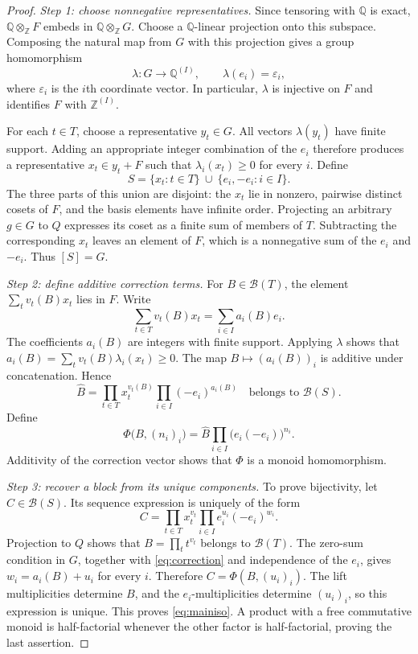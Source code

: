 \documentclass[11pt,reqno]{amsart}
\numberwithin{equation}{section}
\theoremstyle{definition}
\theoremstyle{remark}
\newcommand{\Z}{\mathbb Z}
\newcommand{\Q}{\mathbb Q}
\newcommand{\B}{\mathcal B}
\begin{document}
\begin{proof}
\emph{Step 1: choose nonnegative representatives.}
Since tensoring with $\Q$ is exact,
$\Q\otimes_{\Z}F$ embeds in $\Q\otimes_{\Z}G$. Choose a
$\Q$-linear projection onto this subspace. Composing the natural
map from $G$ with this projection gives a group homomorphism
\[
 \lambda:G\longrightarrow\Q^{(I)},\qquad
 \lambda(e_i)=\varepsilon_i,
\]
where $\varepsilon_i$ is the $i$th coordinate vector. In particular,
$\lambda$ is injective on $F$ and identifies $F$ with
$\Z^{(I)}$.

For each $t\in T$, choose a representative $y_t\in G$. All vectors
$\lambda(y_t)$ have finite support. Adding an appropriate integer
combination of the $e_i$ therefore produces a representative
$x_t\in y_t+F$ such that $\lambda_i(x_t)\ge0$ for every $i$.
Define
\begin{equation}\label{eq:S}
 S=\{x_t:t\in T\}\ \cup\ \{e_i,-e_i:i\in I\}.
\end{equation}
The three parts of this union are disjoint: the $x_t$ lie in
nonzero, pairwise distinct cosets of $F$, and the basis elements
have infinite order. Projecting an arbitrary $g\in G$ to $Q$
expresses its coset as a finite sum of members of $T$. Subtracting
the corresponding $x_t$ leaves an element of $F$, which is a
nonnegative sum of the $e_i$ and $-e_i$. Thus $[S]=G$.

\emph{Step 2: define additive correction terms.}
For $B\in\B(T)$, the element $\sum_t v_t(B)x_t$ lies in $F$.
Write
\begin{equation}\label{eq:correction}
 \sum_{t\in T}v_t(B)x_t=\sum_{i\in I}a_i(B)e_i.
\end{equation}
The coefficients $a_i(B)$ are integers with finite support.
Applying $\lambda$ shows that
$a_i(B)=\sum_t v_t(B)\lambda_i(x_t)\ge0$. The map
$B\mapsto(a_i(B))_i$ is additive under concatenation. Hence
\begin{equation}\label{eq:hat}
 \widehat B=
 \prod_{t\in T}x_t^{v_t(B)}
 \prod_{i\in I}(-e_i)^{a_i(B)}
 \quad\text{belongs to }\B(S).
\end{equation}
Define
\begin{equation}\label{eq:Phi}
 \Phi\bigl(B,(n_i)_i\bigr)=
 \widehat B\prod_{i\in I}\bigl(e_i(-e_i)\bigr)^{n_i}.
\end{equation}
Additivity of the correction vector shows that $\Phi$ is a monoid
homomorphism.

\emph{Step 3: recover a block from its unique components.}
To prove bijectivity, let $C\in\B(S)$. Its sequence expression is
uniquely of the form
\[
 C=\prod_{t\in T}x_t^{v_t}
   \prod_{i\in I}e_i^{u_i}(-e_i)^{w_i}.
\]
Projection to $Q$ shows that $B=\prod_t t^{v_t}$ belongs to
$\B(T)$. The zero-sum condition in $G$, together with
\eqref{eq:correction} and independence of the $e_i$, gives
$w_i=a_i(B)+u_i$ for every $i$. Therefore
$C=\Phi(B,(u_i)_i)$. The lift multiplicities determine $B$, and
the $e_i$-multiplicities determine $(u_i)_i$, so this expression is
unique. This proves \eqref{eq:mainiso}. A product with a free
commutative monoid is half-factorial whenever the other factor is
half-factorial, proving the last assertion.
\end{proof}
\end{document}
